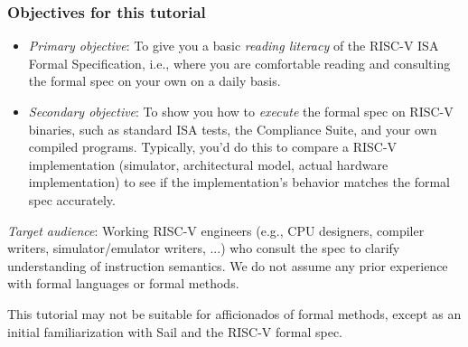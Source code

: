 \documentclass[aspectratio=169]{beamer}
\newcommand{\slidefont}{\scriptsize}
\begin{document}

\begin{frame}[fragile]
  \frametitle{Objectives for this tutorial}

  \slidefont

  \begin{itemize}
    \item \emph{Primary objective}: To give you a basic \emph{reading
      literacy} of the RISC-V ISA Formal Specification, i.e., where
      you are comfortable reading and consulting the formal spec on
      your own on a daily basis.

    \item \emph{Secondary objective}: To show you how to \emph{execute} the
      formal spec on RISC-V binaries, such as standard ISA tests, the
      Compliance Suite, and your own compiled programs.  Typically,
      you'd do this to compare a RISC-V implementation (simulator,
      architectural model, actual hardware implementation) to see if
      the implementation's behavior matches the formal spec
      accurately.

 \end{itemize}

 \emph{Target audience}: Working RISC-V engineers (e.g., CPU
 designers, compiler writers, simulator/emulator writers, ...) who
 consult the spec to clarify understanding of instruction semantics.
 We do not assume any prior experience with formal languages or formal
 methods.

 \vspace{1ex}

 This tutorial may not be suitable for afficionados of formal methods,
 except as an initial familiarization with Sail and the RISC-V formal
 spec.

\end{frame}

\end{document}
